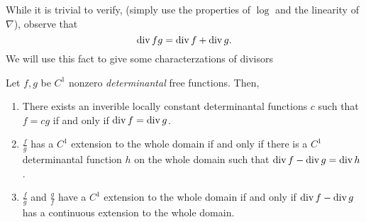 While it is trivial to verify, (simply use the properties of \(\log \) and the
linearity of \(\nabla\)), {\color{fgreen} observe that}
\[
  \operatorname{div} fg = \operatorname{div} f + \operatorname{div} g.
\]
We will use this fact {\color{fgreen} to give some characterzations of divisors}

\begin{lemma}%
\label{lem:ob21}
  Let \(f,g\) be \(C^1\) nonzero \emph{determinantal} free functions. Then,
  \begin{enumerate}
    \item There exists an inverible locally constant determinantal functions
          \(c\) such that \(f=cg\) if and only if \(\operatorname{div} f = \operatorname{div} g\).
    \item \(\frac{f}{g} \)  has a \(C^1\) extension to the whole domain if and
          only if there is a \(C^1\) determinantal function \(h\) on the whole
          domain such that \(\operatorname{div} f - \operatorname{div} g = \operatorname{div} h\).
    \item \(\frac{f}{g}\) and \(\frac{g}{f}\) have a \(C^1\) extension to the
          whole domain if and only if \(\operatorname{div} f - \operatorname{div} g\) has a continuous
          extension to the whole domain.
  \end{enumerate}
\end{lemma}

